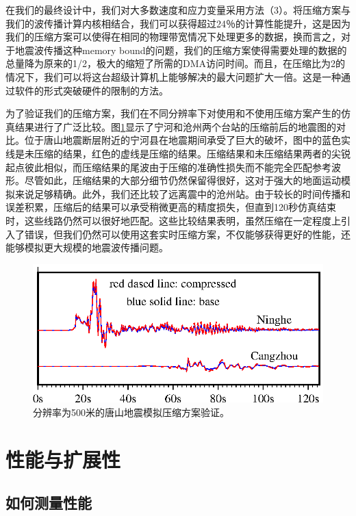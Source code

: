 \documentclass[degree=doctor]{thuthesis}
\begin{document}
在我们的最终设计中，我们对大多数速度和应力变量采用方法（3）。将压缩方案与我们的波传播计算内核相结合，我们可以获得超过24％的计算性能提升，这是因为我们的压缩方案可以使得在相同的物理带宽情况下处理更多的数据，换而言之，对于地震波传播这种memory bound的问题，我们的压缩方案使得需要处理的数据的总量降为原来的1/2，极大的缩短了所需的DMA访问时间。而且，在压缩比为2的情况下，我们可以将这台超级计算机上能够解决的最大问题扩大一倍。这是一种通过软件的形式突破硬件的限制的方法。


为了验证我们的压缩方案，我们在不同分辨率下对使用和不使用压缩方案产生的仿真结果进行了广泛比较。图\ref {fig:compress_valid}显示了宁河和沧州两个台站的压缩前后的地震图的对比。位于唐山地震断层附近的宁河县在地震期间承受了巨大的破坏，图中的蓝色实线是未压缩的结果，红色的虚线是压缩的结果。压缩结果和未压缩结果两者的尖锐起点彼此相似，而压缩结果的尾波由于压缩的准确性损失而不能完全匹配参考波形。尽管如此，压缩结果的大部分细节仍然​​保留得很好，这对于强大的地面运动模拟来说足够精确。此外，我们还比较了远离震中的沧州站。由于较长的时间传播和误差积累，压缩后的结果可以承受稍微更高的精度损失，但直到120秒仿真结束时，这些线路仍然可以很好地匹配。这些比较结果表明，虽然压缩在一定程度上引入了错误，但我们仍然可以使用这套实时压缩方案，不仅能够获得更好的性能，还能够模拟更大规模的地震波传播问题。

\begin{figure}[h]
\centering
\includegraphics[width=0.9\columnwidth]{CompareCompress.eps}
\caption{分辨率为500米的唐山地震模拟压缩方案验证。}
\label{fig:compress_valid}
\end{figure}

\section{性能与扩展性}

\subsection{如何测量性能}
\end{document}
